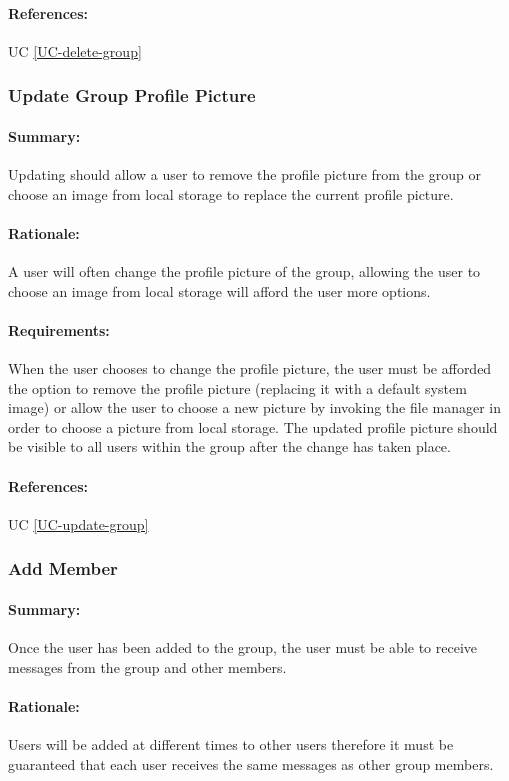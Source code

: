 \documentclass[11pt]{article}
\begin{document}
\paragraph{References:} UC \ref{UC-delete-group}

\subsubsection{Update Group Profile Picture} \label{FR-update-group-picture}
\paragraph{Summary:}
Updating should allow a user to remove the profile picture from the group or choose an image from local storage to replace the current profile picture.
\paragraph{Rationale:}
A user will often change the profile picture of the group, allowing the user to choose an image from local storage will afford the user more options.
\paragraph{Requirements:}
When the user chooses to change the profile picture, the user must be afforded the option to remove the profile picture (replacing it with a default system image) or allow the user to choose a new picture by invoking the file manager in order to choose a picture from local storage. The updated profile picture should be visible to all users within the group after the change has taken place.
\paragraph{References:} UC \ref{UC-update-group}

\subsubsection{Add Member} \label{FR-add-member}
\paragraph{Summary:}
Once the user has been added to the group, the user must be able to receive messages from the group and other members.
\paragraph{Rationale:}
Users will be added at different times to other users therefore it must be guaranteed that each user receives the same messages as other group members.
\end{document}
